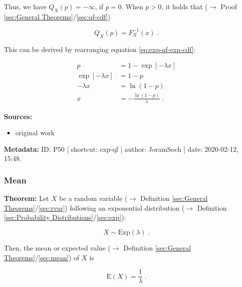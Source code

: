 \documentclass[a4paper,12pt,twoside]{book}
\begin{document}
Thus, we have $Q_X(p) = -\infty$, if $p = 0$. When $p > 0$, it holds that ($\rightarrow$ Proof \ref{sec:General Theorems}/\ref{sec:qf-cdf})

\begin{equation} \label{eq:exp-qf-exp-qf-s1}
Q_X(p) = F_X^{-1}(x) \; .
\end{equation}

This can be derived by rearranging equation \eqref{eq:exp-qf-exp-cdf}:

\begin{equation} \label{eq:exp-qf-exp-qf-s2}
\begin{split}
p &= 1 - \exp[-\lambda x] \\
\exp[-\lambda x] &= 1-p \\
-\lambda x &= \ln(1-p) \\
x &= -\frac{\ln(1-p)}{\lambda} \; .
\end{split}
\end{equation}


\vspace{1em}
\textbf{Sources:}
\begin{itemize}
\item original work\end{itemize}


\vspace{1em}
\textbf{Metadata:} ID: P50 | shortcut: exp-qf | author: JoramSoch | date: 2020-02-12, 15:48.
\vspace{1em}



\subsubsection[\textbf{Mean}]{Mean} \label{sec:exp-mean}
\setcounter{equation}{0}

\textbf{Theorem:} Let $X$ be a random variable ($\rightarrow$ Definition \ref{sec:General Theorems}/\ref{sec:rvar}) following an exponential distribution ($\rightarrow$ Definition \ref{sec:Probability Distributions}/\ref{sec:exp}):

\begin{equation} \label{eq:exp-mean-exp}
X \sim \mathrm{Exp}(\lambda) \; .
\end{equation}

Then, the mean or expected value ($\rightarrow$ Definition \ref{sec:General Theorems}/\ref{sec:mean}) of $X$ is

\begin{equation} \label{eq:exp-mean-exp-mean}
\mathrm{E}(X) = \frac{1}{\lambda} \; .
\end{equation}
\end{document}
